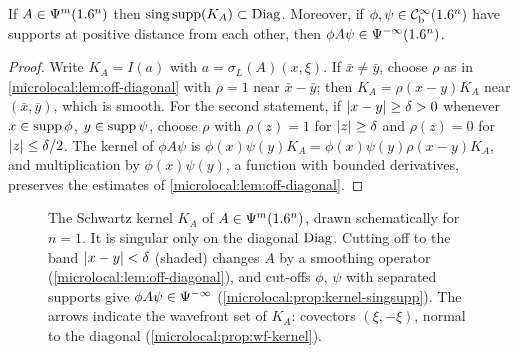 \begin{proposition}\label{microlocal:prop:kernel-singsupp}
  If $A\in\Psi^{m}(1.6^n)$ then $\operatorname{sing\,supp}(K_A)\subset\operatorname{Diag}$. Moreover, if
  $\phi,\psi\in\mathcal{C}^\infty_{\mathrm{b}}(1.6^n)$ have supports at positive distance from each
  other, then $\phi A\psi\in\Psi^{-\infty}(1.6^n)$.
\end{proposition}
\begin{proof}
  Write $K_A=I(a)$ with $a=\sigma_L(A)(x,\xi)$. If $\bar x\ne\bar y$, choose
  $\rho$ as in \cref{microlocal:lem:off-diagonal} with $\rho=1$ near
  $\bar x-\bar y$; then $K_A=\rho(x-y)K_A$ near $(\bar x,\bar y)$, which is
  smooth. For the second statement, if $\lvert x-y\rvert\ge\delta>0$ whenever
  $x\in\operatorname{supp}\phi$, $y\in\operatorname{supp}\psi$, choose $\rho$ with $\rho(z)=1$ for
  $\lvert z\rvert\ge\delta$ and $\rho(z)=0$ for $\lvert z\rvert\le\delta/2$. The kernel of
  $\phi A\psi$ is
  $\phi(x)\psi(y)K_A=\phi(x)\psi(y)\rho(x-y)K_A$, and multiplication by
  $\phi(x)\psi(y)$, a function with bounded derivatives, preserves the
  estimates of \cref{microlocal:lem:off-diagonal}.
\end{proof}

\begin{figure}[htbp]
\centering
{}
\caption[Pseudolocality: the kernel is singular only on the diagonal]{The
Schwartz kernel $K_A$ of $A\in\Psi^{m}(1.6^n)$, drawn schematically for $n=1$.
It is singular only on the diagonal $\operatorname{Diag}$. Cutting off to the band
$\lvert x-y\rvert<\delta$ (shaded) changes $A$ by a smoothing operator
(\cref{microlocal:lem:off-diagonal}), and cut-offs $\phi$, $\psi$ with
separated supports give $\phi A\psi\in\Psi^{-\infty}$
(\cref{microlocal:prop:kernel-singsupp}). The arrows indicate the wavefront
set of $K_A$: covectors $(\xi,-\xi)$, normal to the diagonal
(\cref{microlocal:prop:wf-kernel}).}
\label{microlocal:fig:kernel}
\end{figure}

